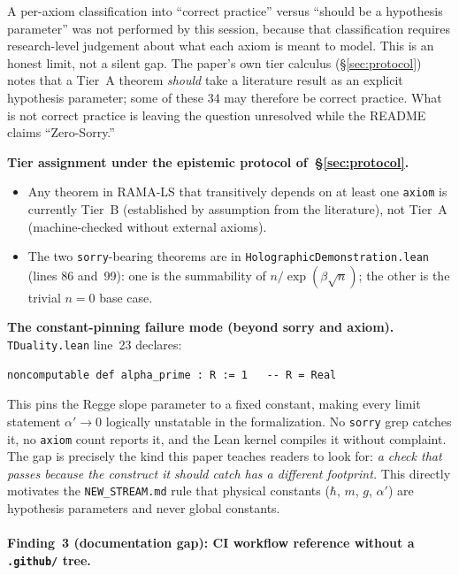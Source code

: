 \documentclass[11pt,a4paper]{article}
\theoremstyle{plain}
\theoremstyle{definition}
\theoremstyle{remark}
\begin{document}
\noindent
A per-axiom classification into ``correct practice'' versus ``should be a
hypothesis parameter'' was not performed by this session, because that
classification requires research-level judgement about what each axiom is
meant to model.
This is an honest limit, not a silent gap.
The paper's own tier calculus (§\ref{sec:protocol}) notes that a Tier~A
theorem \emph{should} take a literature result as an explicit hypothesis
parameter; some of these 34 may therefore be correct practice.
What is not correct practice is leaving the question unresolved while the
README claims ``Zero-Sorry.''

\noindent
\textbf{Tier assignment under the epistemic protocol of~§\ref{sec:protocol}.}
\begin{itemize}
  \item Any theorem in RAMA-LS that transitively depends on at least one
    \texttt{axiom} is currently Tier~B (established by assumption from
    the literature), not Tier~A (machine-checked without external axioms).
  \item The two \texttt{sorry}-bearing theorems are in
    \texttt{HolographicDemonstration.lean} (lines 86 and~99):
    one is the summability of $n/\exp(\beta\sqrt{n})$;
    the other is the trivial $n=0$ base case.
\end{itemize}

\noindent
\textbf{The constant-pinning failure mode (beyond sorry and axiom).}
\texttt{TDuality.lean} line~23 declares:
\begin{verbatim}
noncomputable def alpha_prime : R := 1   -- R = Real
\end{verbatim}
This pins the Regge slope parameter to a fixed constant, making every
limit statement $\alpha' \to 0$ logically unstatable in the formalization.
No \texttt{sorry} grep catches it, no \texttt{axiom} count reports it,
and the Lean kernel compiles it without complaint.
The gap is precisely the kind this paper teaches readers to look for:
\emph{a check that passes because the construct it should catch has a
different footprint.}
This directly motivates the \texttt{NEW\_STREAM.md} rule that physical
constants ($\hbar$, $m$, $g$, $\alpha'$) are hypothesis parameters and
never global constants.

\paragraph{Finding~3 (documentation gap):
CI workflow reference without a \texttt{.github/} tree.}
\end{document}
